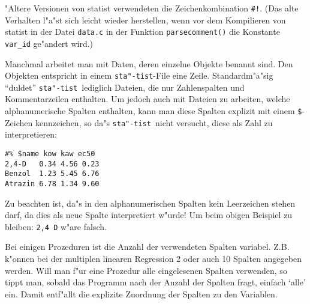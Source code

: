\documentclass[a4paper,11pt]{article}
\newcommand{\st}{{\tt sta"-tist}}
\begin{document}
"Altere Versionen von statist verwendeten die Zeichenkombination
\verb|#!|. {(Das alte Verhalten l"a"st sich leicht wieder herstellen,
wenn vor dem Kompilieren von statist in der Datei {\tt data.c} 
in der Funktion {\tt parsecomment()}
die Konstante {\tt \verb|var_id|} ge"andert wird.)}





Manchmal arbeitet man mit Daten, deren einzelne Objekte benannt
sind. Den Objekten entspricht in einem \st-File eine
Zeile. Standardm"a"sig "`duldet"' \st\ lediglich Dateien, die nur
Zahlenspalten und Kommentarzeilen enthalten. Um jedoch auch mit
Dateien zu arbeiten, welche alphanumerische Spalten enthalten, kann
man diese Spalten explizit mit einem \verb|$|-Zeichen kennzeichen, so da"s
\st\ nicht versucht, diese als Zahl zu interpretieren:

\begin{verbatim}
#% $name kow kaw ec50
2,4-D   0.34 4.56 0.23
Benzol  1.23 5.45 6.76
Atrazin 6.78 1.34 9.60
\end{verbatim}

Zu beachten ist, da"s in den alphanumerischen Spalten kein Leerzeichen
stehen darf, da dies als neue Spalte interpretiert w"urde! Um beim
obigen Beispiel zu bleiben: \verb|2,4 D| w"are falsch.

Bei einigen Prozeduren ist die Anzahl der verwendeten Spalten
variabel. Z.B. k"onnen bei der multiplen linearen Regression 2 oder
auch 10 Spalten angegeben werden. Will man f"ur eine Prozedur alle
eingelesenen Spalten verwenden, so tippt man, sobald das Programm nach
der Anzahl der Spalten fragt, einfach `alle' ein. Damit entf"allt die
explizite Zuordnung der Spalten zu den Variablen.
\end{document}
